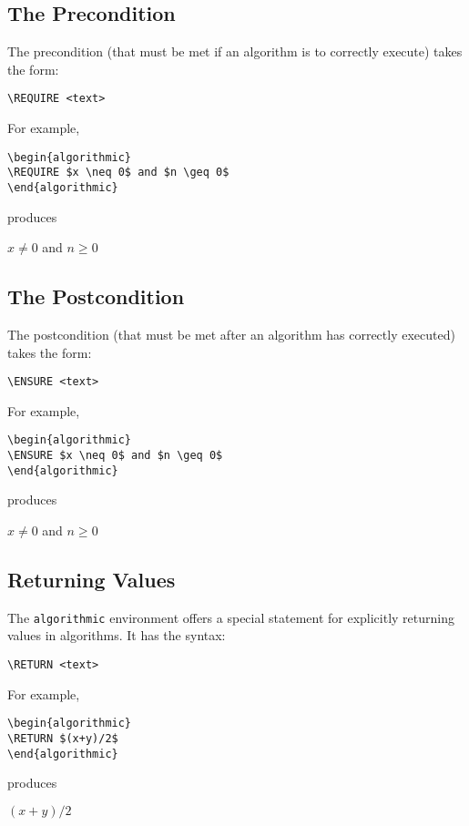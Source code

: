 \documentclass[letterpaper]{article}
\newcommand{\keyword}[1]{\texttt{#1}}
\begin{document}
\subsection{The Precondition}

The precondition (that must be met if an algorithm is to correctly
execute) takes the form:
\begin{verbatim}
\REQUIRE <text>
\end{verbatim}
For example,
\begin{verbatim}
\begin{algorithmic}
\REQUIRE $x \neq 0$ and $n \geq 0$
\end{algorithmic}
\end{verbatim}
produces
\begin{algorithmic}
  \REQUIRE $x \neq 0$ and $n \geq 0$
\end{algorithmic}

\subsection{The Postcondition}

The postcondition (that must be met after an algorithm has correctly
executed) takes the form:
\begin{verbatim}
\ENSURE <text>
\end{verbatim}
For example,
\begin{verbatim}
\begin{algorithmic}
\ENSURE $x \neq 0$ and $n \geq 0$
\end{algorithmic}
\end{verbatim}
produces
\begin{algorithmic}
  \ENSURE $x \neq 0$ and $n \geq 0$
\end{algorithmic}

\subsection{Returning Values}

The \keyword{algorithmic} environment offers a special statement for
explicitly returning values in algorithms. It has the syntax:
\begin{verbatim}
\RETURN <text>
\end{verbatim}
For example,
\begin{verbatim}
\begin{algorithmic}
\RETURN $(x+y)/2$
\end{algorithmic}
\end{verbatim}
produces
\begin{algorithmic}
  \RETURN $(x+y)/2$
\end{algorithmic}
\end{document}
